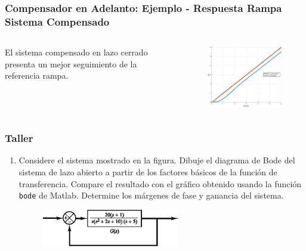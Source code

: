 \documentclass[aspectratio=169, handout]{beamer}
\theoremstyle{definition}
\theoremstyle{plain}
\theoremstyle{remark}
\newcounter{saveenumi}
\newcommand{\seti}{\setcounter{saveenumi}{\value{enumi}}}
\begin{document}
\begin{frame}[<+->]\frametitle{Compensador en Adelanto: Ejemplo - Respuesta Rampa Sistema Compensado}
\vspace*{-2mm}
\begin{columns}
	\begin{column}{0.3\textwidth}
		El sistema compensado en lazo cerrado presenta un mejor seguimiento de la referencia rampa.
	\end{column}
	\begin{column}{0.7\textwidth}
		\begin{figure}
			\centering
			\includegraphics[width=9cm]{images/bodeLeadCompExampleRamp.eps}
		\end{figure}
	\end{column}
\end{columns}
\end{frame}

\begin{frame}[c]\frametitle{Taller}
\begin{enumerate}
	\item Considere el sistema mostrado en la figura. Dibuje el diagrama de Bode del sistema de lazo abierto a partir de los factores básicos de la función de transferencia. Compare el resultado con el gráfico obtenido usando la función \texttt{bode} de Matlab. Determine los márgenes de fase y ganancia del sistema.
	\begin{figure}
		\centering
		\includegraphics[width=6cm]{images/exercise1.eps}
	\end{figure}
	\seti 
\end{enumerate}
\end{frame}
\end{document}
